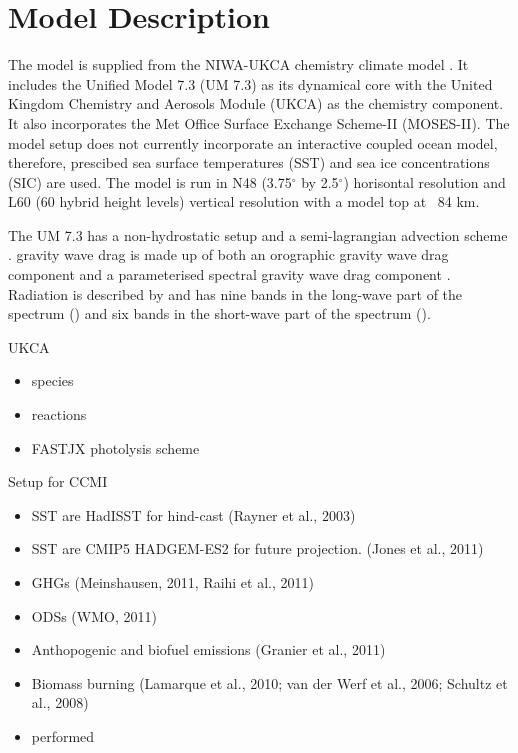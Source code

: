 \section{Model Description}

The model is supplied from the NIWA-UKCA chemistry climate model \citep{Morgenstern:2009bu}. It includes the Unified Model 7.3 (UM 7.3) as its dynamical core with the United Kingdom Chemistry and Aerosols Module (UKCA) as the chemistry component. It also incorporates the Met Office Surface Exchange Scheme-II (MOSES-II). The model setup does not currently incorporate an interactive coupled ocean model, therefore, prescibed sea surface temperatures (SST) and sea ice concentrations (SIC) are used. The model is run in N48 (3.75$^\circ$ by 2.5$^\circ$) horisontal resolution and L60 (60 hybrid height levels) vertical resolution with a model top at ~84 km.

The UM 7.3 has a non-hydrostatic setup \citep{Davies:2005vu} and a semi-lagrangian advection scheme \citep{Priestley:1993ur}. gravity wave drag is made up of both an orographic gravity wave drag component \citep{Webster:2003vf} and a parameterised spectral gravity wave drag component \citep{Scaife:2002vt}. Radiation is described by \cite{Edwards:1996wo} and has nine bands in the long-wave part of the spectrum () and six bands in the short-wave part of the spectrum ().

UKCA
\begin{itemize}
\item species
\item reactions
\item FASTJX photolysis scheme
\end{itemize}


Setup for CCMI
\begin{itemize}
\item SST are HadISST for hind-cast (Rayner et al., 2003)
\item SST are CMIP5 HADGEM-ES2 for future projection. (Jones et al., 2011)
\item GHGs (Meinshausen, 2011, Raihi et al., 2011)
\item ODSs (WMO, 2011)
\item Anthopogenic and biofuel emissions (Granier et al., 2011)
\item Biomass burning (Lamarque et al., 2010; van der Werf et al., 2006; Schultz et al., 2008)
\item performed
\end{itemize}


